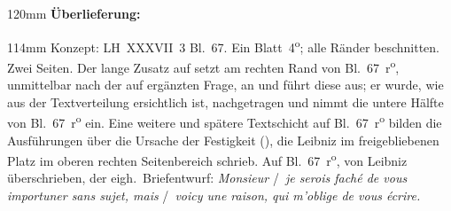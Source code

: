 \begin{ledgroupsized}[r]{120mm}
\footnotesize
\pstart
\noindent\textbf{Überlieferung:}
\pend
\end{ledgroupsized}
\begin{ledgroupsized}[r]{114mm}
\footnotesize
\pstart \parindent -6mm
%
Konzept:
LH~XXXVII~3 Bl.~67.
Ein Blatt~4\textsuperscript{o};
alle Ränder beschnitten.
Zwei Seiten.
Der lange Zusatz auf  
setzt am rechten Rand von Bl.~67~r\textsuperscript{o}, unmittelbar nach der auf  ergänzten Frage, an und führt diese aus; er wurde, wie aus der Textverteilung ersichtlich ist, nachgetragen und nimmt die untere Hälfte von Bl.~67~r\textsuperscript{o} ein.
Eine weitere und spätere Textschicht auf Bl.~67~r\textsuperscript{o} bilden die Ausführungen über die Ursache der Festigkeit (), die Leibniz im freigebliebenen Platz im oberen rechten Seitenbereich schrieb.
Auf Bl.~67~r\textsuperscript{o}, von Leibniz überschrieben, der eigh.\ Briefentwurf: 
\textit{Monsieur} \lbrack/\rbrack\ 
\textit{je serois faché de vous importuner sans sujet, mais} \lbrack/\rbrack\ 
\textit{voicy une raison, qui m'oblige de vous écrire.}
\pend
\end{ledgroupsized}
\vspace{5mm}
